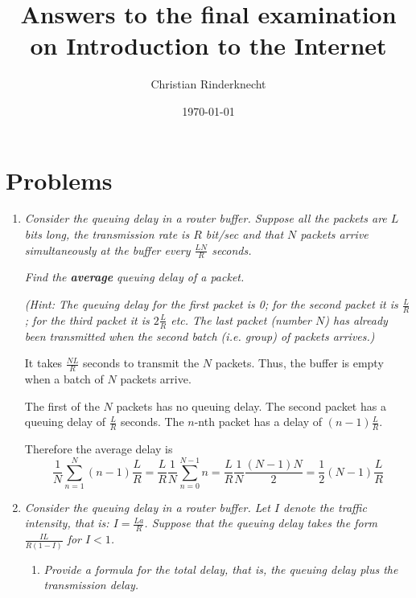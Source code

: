 \documentclass[12pt,a4paper]{article}
\title{Answers to the final examination on Introduction to the Internet}
\author{Christian Rinderknecht}
\date{\today}
\begin{document}
\maketitle

\section{Problems}

\begin{enumerate}

  \item \emph{Consider the queuing delay in a router buffer. Suppose
    all the packets are \(L\) bits long, the transmission rate is
    \(R\) bit/sec and that \(N\) packets arrive simultaneously at the
    buffer every \(\frac{LN}{R}\) seconds.}

    \emph{Find the \textbf{average} queuing delay of a packet.}

    \emph{(\emph{Hint}: The queuing delay for the first packet is 0;
      for the second packet it is \(\frac{L}{R}\); for the third
      packet it is \(2{\frac{L}{R}}\) etc. The last packet (number
      \(N\)) has already been transmitted when the second batch
      (i.e. group) of packets arrives.)}

    It takes \(\frac{NL}{R}\) seconds to transmit the \(N\)
    packets. Thus, the buffer is empty when a batch of \(N\) packets
    arrive.

    The first of the \(N\) packets has no queuing delay. The second
    packet has a queuing delay of \(\frac{L}{R}\) seconds. The
    \(n\)-nth packet has a delay of \((n-1){\frac{L}{R}}\).

   Therefore the average delay is
   \setlength\mathindent{-1pc}
   \[
     {\frac{1}{N}}\sum_{n=1}^{N}(n-1){\frac{L}{R}} = \frac{L}{R}
     \frac{1}{N} \sum_{n=0}^{N-1}n = \frac{L}{R} \frac{1}{N}
     \frac{(N-1)N}{2} = \frac{1}{2} (N-1) \frac{L}{R} 
   \]

  \item \emph{Consider the queuing delay in a router buffer. Let \(I\)
    denote the traffic intensity, that is: \(I =
    \frac{La}{R}\). Suppose that the queuing delay takes the form
    \(\frac{IL}{R(1-I)}\) for \(I < 1\).}
    \begin{enumerate}

      \item \emph{Provide a formula for the total delay, that is, the
        queuing delay plus the transmission delay.}


\end{enumerate}
\end{enumerate}
\end{document}
